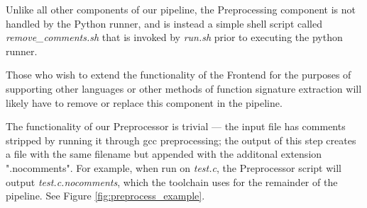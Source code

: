 \documentclass{article}
\begin{document}
\noindent Unlike all other components of our pipeline, the Preprocessing component is not handled by the Python runner, and is instead a simple shell script called \textit{remove\_comments.sh} that is invoked by \textit{run.sh} prior to executing the python runner.

Those who wish to extend the functionality of the Frontend for the purposes of supporting other languages or other methods of function signature extraction will likely have to remove or replace this component in the pipeline.

The functionality of our Preprocessor is trivial --- the input file has comments stripped by running it through gcc preprocessing; the output of this step creates a file with the same filename but appended with the additonal extension ".nocomments". For example, when run on \textit{test.c}, the Preprocessor script will output \textit{test.c.nocomments}, which the toolchain uses for the remainder of the pipeline. See Figure \ref{fig:preprocess_example}.
\end{document}
